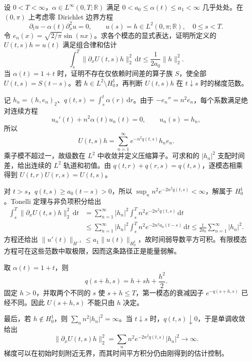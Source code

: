 \begin{exercise}\label{b2:ex:app-D-9}
设 \(0<T<\infty\)，\(\alpha\in L^\infty(0,T;\mathbb R)\) 满足 \(0<a_0\leq\alpha(t)\leq a_1<\infty\) 几乎处处。在 \((0,\pi)\) 上考虑零 Dirichlet 边界方程
\[
 \partial_tu-\alpha(t)\partial_x^2u=0,
 \qquad u(s)=h\in L^2(0,\pi;\mathbb R),\quad 0\leq s<T.
\]
令 \(e_n(x)=\sqrt{2/\pi}\sin(nx)\)。求各个模态的显式表达，证明所定义的 \(U(t,s)h=u(t)\) 满足组合律和估计
\[
 \int_s^T\|\partial_xU(t,s)h\|_2^2\,\mathrm dt
 \leq\frac1{2a_0}\|h\|_2^2.
\]
当 \(\alpha(t)=1+t\) 时，证明不存在仅依赖时间差的算子族 \(S\)，使全部 \(U(t,s)=S(t-s)\)。若 \(h\in L^2\setminus H_0^1\)，再判断 \(U(t,s)h\) 在 \(t\downarrow s\) 时的梯度范数。
\end{exercise}
\begin{solution}
记 \(h_n=(h,e_n)_2\)、\(q(t,s)=\int_s^t\alpha(r)\,\mathrm dr\)。由于 \(-e_n''=n^2e_n\)，每个系数满足绝对连续方程
\[
 u_n'(t)+n^2\alpha(t)u_n(t)=0,
 \qquad u_n(s)=h_n,
\]
所以
\[
 U(t,s)h=\sum_{n=1}^\infty e^{-n^2q(t,s)}h_ne_n.
\]
乘子模不超过一，故级数在 \(L^2\) 中收敛并定义压缩算子。可求和的 \(|h_n|^2\) 支配时间差，给出连续的 \(L^2\) 轨道和初值。由 \(q(t,r)+q(r,s)=q(t,s)\)，逐模态相乘得到 \(U(t,r)U(r,s)=U(t,s)\)。

对 \(t>s\)，\(q(t,s)\geq a_0(t-s)>0\)，所以 \(\sup_n n^2e^{-2n^2q(t,s)}<\infty\)，解属于 \(H_0^1\)。Tonelli 定理与非负项积分给出
\[
 \begin{aligned}
 \int_s^T\|\partial_xU(t,s)h\|_2^2\,\mathrm dt
 &=\sum_{n=1}^\infty |h_n|^2
       \int_s^T n^2e^{-2n^2q(t,s)}\,\mathrm dt\\
 &\leq\sum_{n=1}^\infty |h_n|^2
       \int_s^T n^2e^{-2n^2a_0(t-s)}\,\mathrm dt
 \leq\frac1{2a_0}\sum_{n=1}^\infty|h_n|^2.
 \end{aligned}
\]
方程还给出 \(\|u'(t)\|_{H^{-1}}\leq a_1\|u(t)\|_{H_0^1}\)，故时间弱导数平方可积。有限模态方程可在这些范数中取极限，因而这条路径正是能量弱解。

取 \(\alpha(t)=1+t\)，则
\[
 q(s+h,s)=h+sh+\frac{h^2}{2}.
\]
固定 \(h>0\)，并取两个不同的 \(s\) 使 \(s+h\leq T\)，第一模态的衰减因子 \(e^{-q(s+h,s)}\) 已经不同。因此 \(U(s+h,s)\) 不能只由 \(h\) 决定。

最后，若 \(h\notin H_0^1\)，则 \(\sum_n n^2|h_n|^2=\infty\)。当 \(t\downarrow s\) 时，\(q(t,s)\downarrow0\)，于是单调收敛给出
\[
 \|\partial_xU(t,s)h\|_2^2
 =\sum_n n^2e^{-2n^2q(t,s)}|h_n|^2\longrightarrow\infty.
\]
梯度可以在初始时刻附近无界，而其时间平方积分仍由刚得到的估计控制。
\end{solution}

